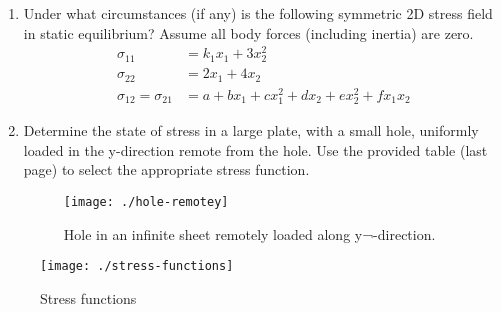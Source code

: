 \documentclass[12pt, oneside]{article}
\begin{document}
\begin{enumerate}
\newpage
\afterpage{\null\newpage}

\item
Under what circumstances (if any) is the following symmetric 2D stress field in static equilibrium?
Assume all body forces (including inertia) are zero.
\begin{align}
	\sigma_{11} &= k_1 x_1 + 3 x_2^2\\
	\sigma_{22} &= 2x_1 + 4x_2\\
	\sigma_{12} = \sigma_{21} &= a + bx_1 + cx_1^2 + dx_2 + ex_2^2 + fx_1x_2
\end{align}

\newpage

\item
Determine the state of stress in a large plate, with a small hole, uniformly loaded in the y-direction remote from the hole.
Use the provided table (last page) to select the appropriate stress function.

\begin{figure}[H]
	\centering
	\texttt{[image: ./hole-remotey]}
	\caption{Hole in an infinite sheet remotely loaded along y¬-direction.}
\end{figure}
\end{enumerate}

\afterpage{\null\newpage}
\newpage


\begin{figure}[H]
	\centering
	\texttt{[image: ./stress-functions]}
	\caption{Stress functions}
\end{figure}
\end{document}
